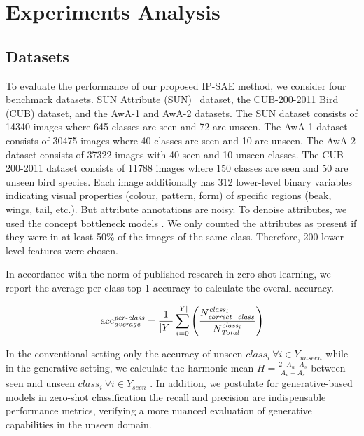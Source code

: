 \documentclass{article}
\begin{document}
\section{Experiments Analysis}
\label{exp}

\subsection{Datasets}
To evaluate the performance of our proposed IP-SAE method, we consider four benchmark datasets. SUN Attribute (SUN)~\cite{sun} dataset, the CUB-200-2011 Bird (CUB) \cite{cub} dataset, and the AwA-1 and AwA-2 \cite{awa} datasets. The SUN dataset consists of 14340 images where 645 classes are seen and 72 are unseen. The AwA-1 dataset consists of 30475 images where 40 classes are seen and 10 are unseen. The AwA-2 dataset consists of 37322 images with 40 seen and 10 unseen classes. The CUB-200-2011 dataset consists of 11788 images where 150 classes are seen and 50 are unseen bird species. Each image additionally has 312 lower-level binary variables indicating visual properties (colour, pattern, form) of specific regions (beak, wings, tail, etc.). But attribute annotations are noisy. To denoise attributes, we used the concept bottleneck models \cite{b55}. We only counted the attributes as present if they were in at least 50\% of the images of the same class. Therefore, 200 lower-level features were chosen. 
\par In accordance with the norm of published research in zero-shot learning, we report the average per class top-1 accuracy to calculate the overall accuracy.

\begin{equation}
\label{eq4}
\text{acc}^{\text{\textit{per-class}}}_{\text{\textit{average}}} = \frac{1}{|Y|} \sum_{i=0}^{|Y|} \left(\frac{N^{\text{\textit{class}}_i}_{\text{\textit{correct\_class}}}}{N^{\text{\textit{class}}_i}_{\text{\textit{Total}}}}\right)
\end{equation}



In the conventional setting only the accuracy of unseen $class_i~\forall i \in Y_{unseen}$ while in the generative setting, we calculate the harmonic mean $H=\frac{2 \cdot A_{u} \cdot A_{s}}{A_{u}+A_{s}}$ between seen and unseen  $class_i~\forall i \in Y_{seen}$ \cite{b58}. In addition, we postulate for generative-based models in zero-shot classification the recall and precision are indispensable performance metrics, verifying a more nuanced evaluation of generative capabilities in the unseen domain.
\end{document}
